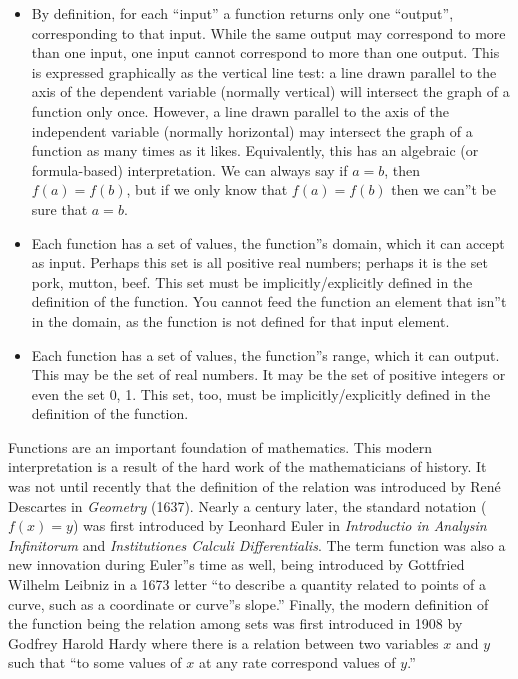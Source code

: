 \begin{itemize}
    \item By definition, for each ``input'' a function returns only one ``output'', corresponding to that input. While the same output may correspond to more than one input, one input cannot correspond to more than one output. This is expressed graphically as the vertical line test: a line drawn parallel to the axis of the dependent variable (normally vertical) will intersect the graph of a function only once. However, a line drawn parallel to the axis of the independent variable (normally horizontal) may intersect the graph of a function as many times as it likes. Equivalently, this has an algebraic (or formula-based) interpretation. We can always say if $a = b$, then $f(a) = f(b)$, but if we only know that $f(a) = f(b)$ then we can''t be sure that $a = b$.
    \item Each function has a set of values, the function''s domain, which it can accept as input. Perhaps this set is all positive real numbers; perhaps it is the set {pork, mutton, beef}. This set must be implicitly/explicitly defined in the definition of the function. You cannot feed the function an element that isn''t in the domain, as the function is not defined for that input element.
    \item Each function has a set of values, the function''s range, which it can output. This may be the set of real numbers. It may be the set of positive integers or even the set {0, 1}. This set, too, must be implicitly/explicitly defined in the definition of the function.
\end{itemize}

Functions are an important foundation of mathematics. This modern interpretation is a result of the hard work of the mathematicians of history. It was not until recently that the definition of the relation was introduced by René Descartes in \textit{Geometry} (1637). Nearly a century later, the standard notation ($f(x) = y$) was first introduced by Leonhard Euler in \textit{Introductio in Analysin Infinitorum} and \textit{Institutiones Calculi Differentialis}. The term function was also a new innovation during Euler''s time as well, being introduced by Gottfried Wilhelm Leibniz in a 1673 letter ``to describe a quantity related to points of a curve, such as a coordinate or curve''s slope.'' Finally, the modern definition of the function being the relation among sets was first introduced in 1908 by Godfrey Harold Hardy where there is a relation between two variables $x$ and $y$ such that ``to some values of $x$ at any rate correspond values of $y$.''

